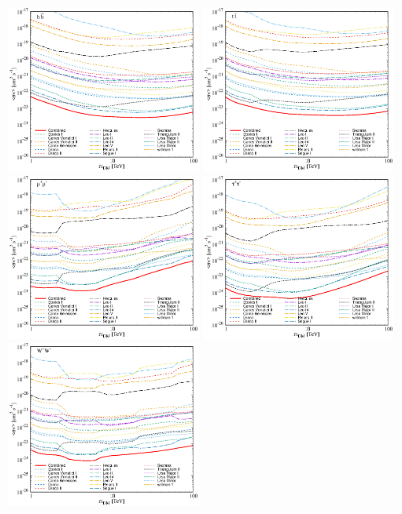 \documentclass[12pt,aps,prd,amsmath,amssymb,showpacs,floats,floatfix,nofootinbib]{revtex4-1}
\begin{document}
\begin{figure}[!htbp]
{\includegraphics[width=0.45\textwidth]{annihilate_bottom.eps}}
{\includegraphics[width=0.45\textwidth]{annihilate_top.eps}}
{\includegraphics[width=0.45\textwidth]{annihilate_mu.eps}}
{\includegraphics[width=0.45\textwidth]{annihilate_tau.eps}}
{\includegraphics[width=0.45\textwidth]{annihilate_W.eps}}

\end{figure}
\end{document}
